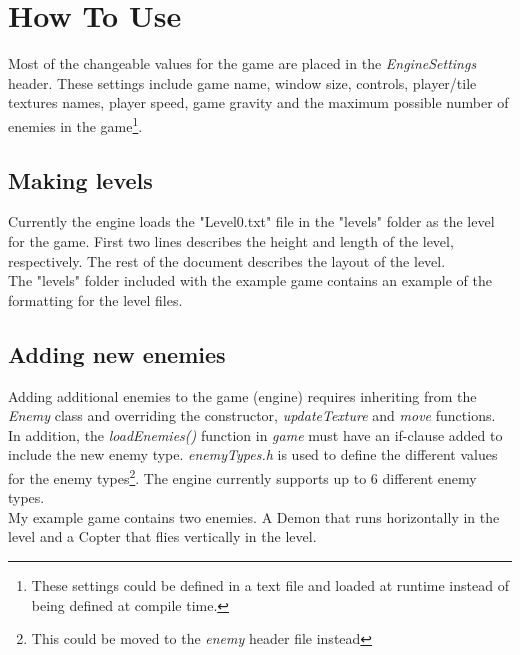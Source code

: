 \section{How To Use}
Most of the changeable values for the game are placed in the \textit{EngineSettings} header. These settings include game name, window size, controls, player/tile textures names, player speed, game gravity and the maximum possible number of enemies in the game\footnote{These settings could be defined in a text file and loaded at runtime instead of being defined at compile time.}.

\subsection{Making levels}
Currently the engine loads the "Level0.txt" file in the "levels" folder as the level for the game. First two lines describes the height and length of the level, respectively. The rest of the document describes the layout of the level.
\\The "levels" folder included with the example game contains an example of the formatting for the level files.
\subsection{Adding new enemies}
Adding additional enemies to the game (engine) requires inheriting from the \textit{Enemy} class and overriding the constructor, \textit{updateTexture} and \textit{move} functions. In addition, the \textit{loadEnemies()} function in \textit{game} must have an if-clause added to include the new enemy type. \textit{enemyTypes.h} is used to define the different values for the enemy types\footnote{This could be moved to the \textit{enemy} header file instead}. The engine currently supports up to 6 different enemy types. 
\\My example game contains two enemies. A Demon that runs horizontally in the level and a Copter that flies vertically in the level.